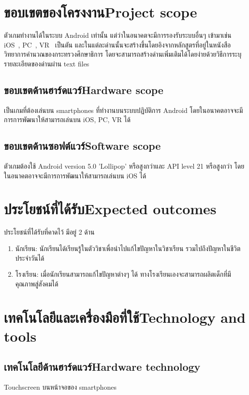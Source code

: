 \section{\ifcpe ขอบเขตของโครงงาน\else Project scope\fi}
ตัวเกมทำงานได้ในระบบ Android เท่านั้น แต่ว่าในอนาคตจะมีการรองรับระบบอื่นๆ 
เข้ามาเช่น iOS~\cite{wios}, PC~\cite{wpc}, VR~\cite{wvr} เป็นตัน 
และในแต่ละด่านนั้นจะสร้างขึ้นโดยอิงจากหลักสูตรที่อยู่ในหนังสือวิทยาการคำนวณของกระทรวงศึกษาธิการ
โดยจะสามารถสร้างด่านเพิ่มเติมได้โดยง่ายด้วยวิธีการระบุรายละเอียดของด่านผ่าน text files

\subsection{\ifcpe ขอบเขตด้านฮาร์ดแวร์\else Hardware scope\fi}
เป็นเกมที่ต้องเล่นบน smartphones ที่ทำงานบนระบบปฏิบัติการ Android โดยในอนาคตอาจจะมีการการพัฒนาให้สามารถเล่นบน iOS, PC, VR ได้

\subsection{\ifcpe ขอบเขตด้านซอฟต์แวร์\else Software scope\fi}
ตัวเกมต้องใช้ Android version 5.0 'Lollipop' หรือสูงกว่าและ API level 21 หรือสูงกว่า
โดยในอนาคตอาจจะมีการการพัฒนาให้สามารถเล่นบน iOS ได้

\section{\ifcpe ประโยชน์ที่ได้รับ\else Expected outcomes\fi}
ประโยชน์ที่ได้รับที่คาดไว้ มีอยู่ 2 ด้าน 
\begin{enumerate}
    \item นักเรียน: นักเรียนได้เรียนรู้ในตัววิชาเพื่อนำไปแก้ไขปัญหาในวิชาเรียน รวมไปถึงปัญหาในชีวิตประจำวันได้
    \item โรงเรียน: เมื่อนักเรียนสามารถแก้ไขปัญหาต่างๆ ได้ ทางโรงเรียนเองจะสามารถผลิตเด็กที่มีคุณภาพสู่สังคมได้ 
\end{enumerate}

\section{\ifcpe เทคโนโลยีและเครื่องมือที่ใช้\else Technology and tools\fi}

\subsection{\ifcpe เทคโนโลยีด้านฮาร์ดแวร์\else Hardware technology\fi}
Touchscreen บนหน้าจอของ smartphones

